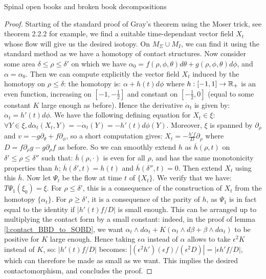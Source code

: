 \documentclass[../main.tex]{subfiles}
\begin{document}
\begin{section}{Spinal open books and broken book decompositions}
\begin{proof}
Starting of the standard proof of Gray's theorem using the Moser trick, see \cite{geiges_introduction_nodate} theorem 2.2.2 for example, we find a suitable time-dependant vector field $X_t$ whose flow will give us the desired isotopy. On $M_\Sigma\cup M_I$, we can find it using the standard method as we have a homotopy of contact structures. Now consider some area $\delta\leq \rho\leq \delta' $ on which we have $\alpha_0 = f(\rho,\phi,\theta)d\theta + g(\rho,\phi,\theta)d\phi$, and $\alpha = \alpha_0$. Then we can compute explicitly the vector field $X_t$ induced by the homotopy on $\rho\leq \delta$: the homotopy is: $\alpha + h(t)d\phi$ where $h:[-1,1]\rightarrow \mathbb{R}_+$ is an even function, increasing on $[-1,-\frac{1}{2}]$ and constant on $[-\frac{1}{2},0]$ (equal to some constant $K$ large enough as before). Hence the derivative $\dot\alpha_t$ is given by: $\dot\alpha_t = h'(t)d\phi$. We have the following defining equation for $X_t\in\xi$: $\forall Y \in \xi, d\alpha_t(X_t,Y) = -\dot\alpha_t(Y) = -h'(t)d\phi(Y)$. Moreover, $\xi$ is spanned by $\partial_\rho$ and $v = -g\partial_\theta + f\partial_\phi$, so a short computation gives: $X_t = -\frac{h'f}{D}\partial_\rho$ where $D = f\partial_\rho g-g\partial_\rho f$ as before. So we can smoothly extend $h$ as $\overline{h}(\rho,t)$ on $\delta'\leq \rho\leq \delta''$ such that: $\overline{h}(\rho,\cdot)$ is even for all $\rho$, and has the same monotonicity properties than $h$; $\overline{h}(\delta',t) = h(t)$ and  $\overline{h}(\delta'',t) = 0$. Then extend $X_t$ using this $\overline{h}$. Now let $\Psi_t$ be the flow at time $t$ of $\{X_t\}$. We verify that we have: $T\Psi_1(\xi_0) = \xi$. For $\rho \leq \delta'$, this is a consequence of the construction of $X_t$ from the homotopy $\{\alpha_t\}$. For $\rho\geq \delta'$, it is a consequence of the parity of $h$, as $\Psi_1$ is in fact equal to the identity if $|h'(t)f/D|$ is small enough. This can be arranged up to multiplying the contact form by a small constant: indeed, in the proof of lemma \ref{l:contact_BBD_to_SOBD}, we want $\alpha_t\wedge d\alpha_t + K(\alpha_t\wedge d\beta + \beta\wedge d\alpha_t)$ to be positive for $K$ large enough. Hence taking $\epsilon \alpha$ instead of $\alpha$ allows to take $\epsilon ^2 K$ instead of $K$, so: $|h'(t) f/D|$ becomes: $|(\epsilon^2h')(\epsilon f)/(\epsilon^2 D)| = |\epsilon h'f/D|$, which can therefore be made as small as we want. This implies the desired contactomorphism, and concludes the proof.

\end{proof}


\end{section}
\end{document}
